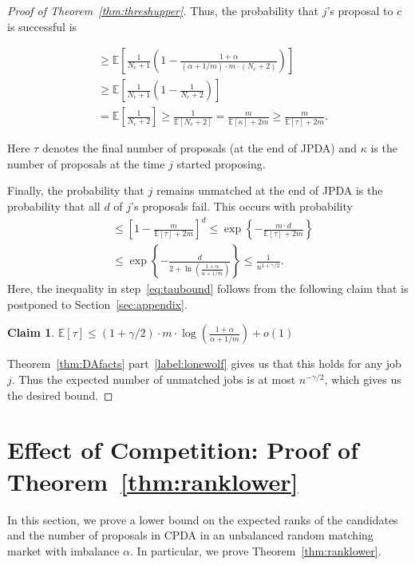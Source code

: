 \documentclass[11pt]{amsart}
\newtheorem{claim}[theorem]{Claim}
\newcommand{\E}{\mathbb{E}}
\begin{document}
\begin{proof}[Proof of Theorem~\ref{thm:threshupper}]
Thus, the probability that $j$'s proposal to $c$ is successful is  

\begin{align*}
    &\geq \E \left[ \frac{1}{N_c+1} \left(1 - \frac{1+\alpha}{(\alpha + 1/m) \cdot m \cdot (N_c+2)} \right)\right] \\
    &\geq \E \left[ \frac{1}{N_c+1} \left(1 -  \frac{1}{N_c+2}\right) \right]\\
    &= \E \left[ \frac{1}{N_c+2}\right] \geq \frac{1}{\E\left[N_c+2\right]} = \frac{m}{\E[\kappa] + 2m} \geq \frac{m}{\E[\tau] + 2m}.
\end{align*}

Here $\tau$ denotes the final number of proposals (at the end of JPDA) and $\kappa$ is the number of proposals at the time $j$ started proposing.

Finally, the probability that $j$ remains unmatched at the end of JPDA is the probability that all $d$ of $j$'s proposals fail. This occurs with probability
\begin{align}
    &\leq {\left[ 1 - \frac{m}{\E[\tau] + 2m}\right]}^d \leq \exp\left\{-\frac{m \cdot d}{\E[\tau] +2m}\right\}\nonumber \\ 
    &\leq \exp \left\{ - \frac{d}{2 + \ln\left(\frac{1+\alpha}{\alpha+1/m}\right)}\right\} \leq \frac{1}{n^{1+\gamma/2}}. \label{eq:taubound}
\end{align}
Here, the inequality in step~\ref{eq:taubound} follows from the following claim that is postponed to Section~\ref{sec:appendix}.   

\begin{claim}\label{lem:jpda-balls-bins}
$\E[\tau] \leq \left(1 + \gamma/2\right) \cdot m \cdot \log \left(\frac{1+\alpha}{\alpha + 1/m}\right) + o(1)$
\end{claim}

Theorem~\ref{thm:DAfacts} part~\ref{label:lonewolf} gives us that this holds for any job $j$. Thus the expected number of unmatched jobs is at most $n^{-\gamma/2}$, which gives us the desired bound.

\end{proof}



 \section{Effect of Competition: Proof of Theorem~\ref{thm:ranklower}}\label{sec:expected}

In this section, we prove a lower bound on the expected ranks of the candidates and the number of proposals in CPDA in an unbalanced random matching market with imbalance $\alpha$.  In particular, we prove Theorem~\ref{thm:ranklower}.
\end{document}
